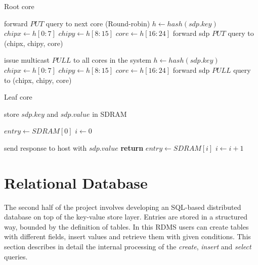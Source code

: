 \begin{algorithm}
\caption{Root core}
\label{alg:root}
\begin{algorithmic}[1]
			\State forward $PUT$ query to next core (Round-robin)
			\State $h \gets hash(sdp.key)$
			\State $chipx \gets h[0:7]$
			\State $chipy \gets h[8:15]$
			\State $core \gets h[16:24]$
			\State forward sdp $PUT$ query to (chipx, chipy, core)
		\EndIf
	\EndIf

			\State issue multicast $PULL$ to all cores in the system
			\State $h \gets hash(sdp.key)$
			\State $chipx \gets h[0:7]$
			\State $chipy \gets h[8:15]$
			\State $core \gets h[16:24]$
			\State forward sdp $PULL$ query to (chipx, chipy, core)
		\EndIf
	\EndIf
\EndProcedure
\end{algorithmic}
\end{algorithm}

\begin{algorithm}
\caption{Leaf core}
\label{alg:leaf}
\begin{algorithmic}[1]
		\State store $sdp.key$ and $sdp.value$ in SDRAM
	\EndIf

		\State $entry \gets SDRAM[0]$
		\State $i \gets 0$		
		
				\State send response to host with $sdp.value$
				\State \textbf{return}
			\EndIf
			\State $entry \gets SDRAM[i]$
			\State $i \gets i+1$
      	\EndWhile
	\EndIf
\EndProcedure
\end{algorithmic}
\end{algorithm}

\section{Relational Database}
The second half of the project involves developing an SQL-based distributed database on top of the key-value store layer. Entries are stored in a structured way, bounded by the definition of tables. In this RDMS users can create tables with different fields, insert values and retrieve them with given conditions. This section describes in detail the internal processing of the \textit{create}, \textit{insert} and \textit{select} queries. 

